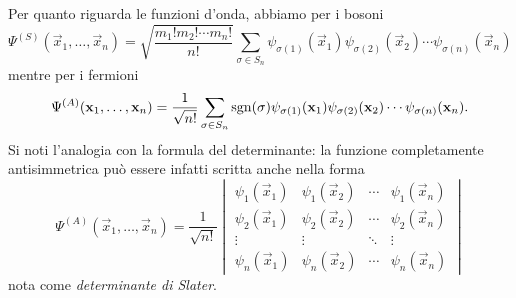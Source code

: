 Per quanto riguarda le funzioni d'onda, abbiamo per i bosoni
\begin{equation}
    \Psi^{(S)}(\vec x_1,\ldots,\vec x_n)=\sqrt{\frac{m_1!m_2!\cdots m_n!}{n!}}\sum_{\sigma\in S_n}\psi_{\sigma(1)}(\vec x_1)\psi_{\sigma(2)}(\vec x_2)\cdots\psi_{\sigma(n)}(\vec x_n)
    \label{eq:funzione-donda-completamente-simmetrica}
\end{equation}
mentre per i fermioni
\begin{equation}
    \Psi^{(A)}(\mathbf{x}_1,\ldots,\mathbf{x}_n)=\frac1{\sqrt{n!}}\sum_{\sigma\in S_n}\operatorname{sgn}(\sigma)\psi_{\sigma(1)}(\mathbf{x}_1)\psi_{\sigma(2)}(\mathbf{x}_2)\cdots\psi_{\sigma(n)}(\mathbf{x}_n).
    \label{eq:funzione-donda-completamente-antisimmetrica}
\end{equation}
Si noti l'analogia con la formula del determinante: la funzione completamente antisimmetrica può essere infatti scritta anche nella forma
\begin{equation}
    \Psi^{(A)}(\vec x_1,\ldots,\vec x_n)=\frac1{\sqrt{n!}}
    \begin{vmatrix}
        \psi_1(\vec x_1) & \psi_1(\vec x_2) & \cdots & \psi_1(\vec x_n) \\
        \psi_2(\vec x_1) & \psi_2(\vec x_2) & \cdots & \psi_2(\vec x_n) \\
        \vdots           & \vdots           & \ddots & \vdots           \\
        \psi_n(\vec x_1) & \psi_n(\vec x_2) & \cdots & \psi_n(\vec x_n)
    \end{vmatrix}
    \label{eq:determinante-slater}
\end{equation}
nota come \emph{determinante di Slater}.


